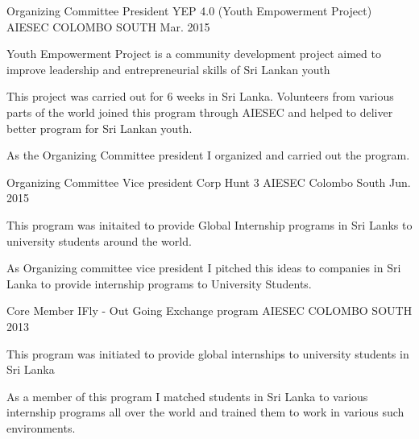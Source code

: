 

\begin{cventries}

  \cventry
    {Organizing Committee President} %
    {YEP 4.0 (Youth Empowerment Project)} %
    {AIESEC COLOMBO SOUTH} %
    {Mar. 2015} %
    {
      \begin{cvitems} %
        \item {Youth Empowerment Project is a community development project aimed to improve leadership and entrepreneurial skills of Sri Lankan youth}
        \item {This project was carried out for 6 weeks in Sri Lanka. Volunteers from various parts of the world joined this program through AIESEC and helped to deliver better program for Sri Lankan youth.}
        \item {As the Organizing Committee president I organized and carried out the program.}
      \end{cvitems}
    }

  \cventry
    {Organizing Committee Vice president} %
    {Corp Hunt 3} %
    {AIESEC Colombo South} %
    {Jun. 2015} %
    {
      \begin{cvitems} %
        \item {This program was initaited to provide Global Internship programs in Sri Lanks to university students around the world.}
        \item {As Organizing committee vice president I pitched this ideas to companies in Sri Lanka to provide internship programs to University Students.}
      \end{cvitems}
    }

  \cventry
    {Core Member} %
    {IFly - Out Going Exchange program} %
    {AIESEC COLOMBO SOUTH} %
    {2013} %
    {
      \begin{cvitems} %
        \item {This program was initiated to provide global internships to university students in Sri Lanka}
        \item {As a member of this program I matched students in Sri Lanka to various internship programs all over the world and trained them to work in various such environments. }
      \end{cvitems}
    }

\end{cventries}
